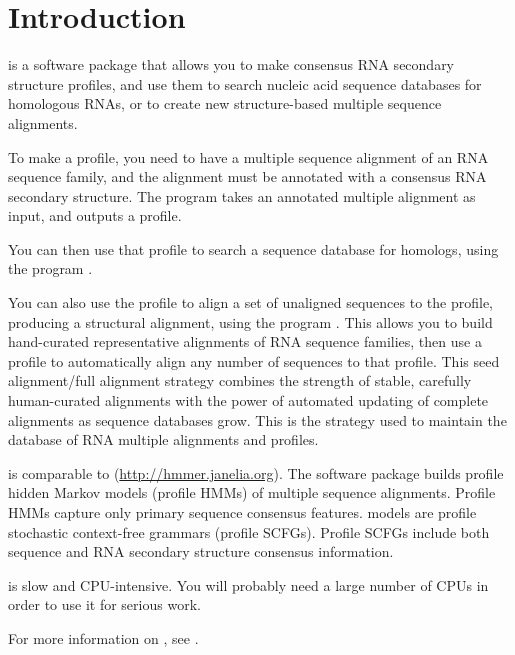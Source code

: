 \section{Introduction}

 is a software package that allows you to make
consensus RNA secondary structure profiles, and use them to search
nucleic acid sequence databases for homologous RNAs, or to create new
structure-based multiple sequence alignments.

To make a profile, you need to have a multiple sequence alignment of
an RNA sequence family, and the alignment must be annotated with a
consensus RNA secondary structure. The program  takes an
annotated multiple alignment as input, and outputs a profile.

You can then use that profile to search a sequence database for homologs,
using the program .

You can also use the profile to align a set of unaligned sequences to
the profile, producing a structural alignment, using the program
. This allows you to build hand-curated representative
alignments of RNA sequence families, then use a profile to
automatically align any number of sequences to that profile.  This
seed alignment/full alignment strategy combines the strength of
stable, carefully human-curated alignments with the power of automated
updating of complete alignments as sequence databases grow. This is
the strategy used to maintain the  database of RNA
multiple alignments and profiles.

 is comparable to 
(\url{http://hmmer.janelia.org}).
The  software package builds profile hidden Markov
models (profile HMMs) of multiple sequence alignments. Profile HMMs
capture only primary sequence consensus features. 
models are profile stochastic context-free grammars (profile SCFGs).
Profile SCFGs include both sequence and RNA secondary structure
consensus information. 

 is slow and CPU-intensive. You will probably need
a large number of CPUs in order to use it for serious work. 

For more information on , see
\cite{Eddy94,Durbin98,Eddy02b,NawrockiEddy07,KolbeEddy09,Nawrocki09,Nawrocki09b}.

















